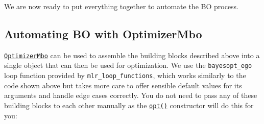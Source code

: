 We are now ready to put everything together to automate the BO process.

\hypertarget{sec-bayesian-black-box-optimization}{%
\subsection{Automating BO with
OptimizerMbo}\label{sec-bayesian-black-box-optimization}}

\href{https://mlr3mbo.mlr-org.com/reference/mlr_optimizers_mbo.html}{\texttt{OptimizerMbo}}
can be used to assemble the building blocks described above into a
single object that can then be used for optimization. We use the
\texttt{bayesopt\_ego} loop function provided by
\texttt{mlr\_loop\_functions}, which works similarly to the code shown
above but takes more care to offer sensible default values for its
arguments and handle edge cases correctly. You do not need to pass any
of these building blocks to each other manually as the
\href{https://bbotk.mlr-org.com/reference/opt.html}{\texttt{opt()}}
constructor will do this for you:

\begin{Shaded}
\begin{Highlighting}[]
\OtherTok{=}\SpecialCharTok{$}\NormalTok{(}\NormalTok{)}
\OtherTok{=} \NormalTok{(}\NormalTok{(}\NormalTok{, } \NormalTok{,}
   \NormalTok{, } \NormalTok{(} \NormalTok{)))}
\OtherTok{=} \NormalTok{(}\NormalTok{)}
\OtherTok{=} \NormalTok{(}\NormalTok{(}\NormalTok{, } \NormalTok{),}
   \NormalTok{(}\NormalTok{, } \NormalTok{, } \NormalTok{))}

\OtherTok{=} \NormalTok{(}\NormalTok{,}
\end{Highlighting}
\end{Shaded}


